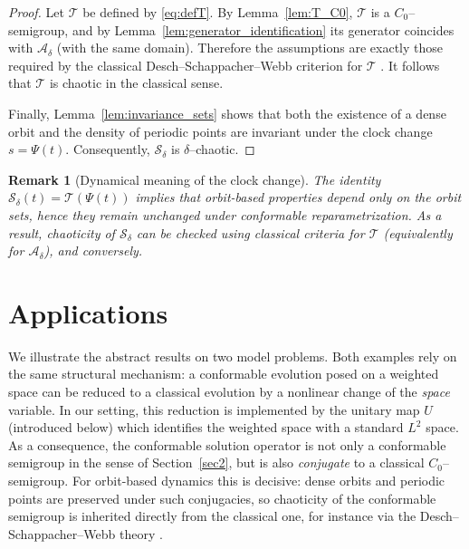 \documentclass[preprint,12pt]{elsarticle}
\newtheorem{remark}{Remark}
\newtheorem{proof}{Proof}
\begin{document}
\begin{proof}
Let $\mathcal T$ be defined by \eqref{eq:defT}.
By Lemma~\ref{lem:T_C0}, $\mathcal T$ is a $C_0$--semigroup, and by
Lemma~\ref{lem:generator_identification} its generator coincides with $\mathcal A_\delta$
(with the same domain).
Therefore the assumptions are exactly those required by the classical
Desch--Schappacher--Webb criterion for $\mathcal T$ \cite{desch1997}.
It follows that $\mathcal T$ is chaotic in the classical sense.

Finally, Lemma~\ref{lem:invariance_sets} shows that both the existence of a dense orbit
and the density of periodic points are invariant under the clock change
$s=\Psi(t)$.
Consequently, $\mathcal S_\delta$ is $\delta$--chaotic.
\end{proof}

\begin{remark}[Dynamical meaning of the clock change]\label{rem:clock_dynamics}
The identity $\mathcal S_\delta(t)=\mathcal T(\Psi(t))$ implies that orbit-based
properties depend only on the orbit sets, hence they remain unchanged under conformable
reparametrization.
As a result, chaoticity of $\mathcal S_\delta$ can be checked using classical criteria
for $\mathcal T$ (equivalently for $\mathcal A_\delta$), and conversely.
\end{remark}

\section{Applications}\label{sec7}

We illustrate the abstract results on two model problems.
Both examples rely on the same structural mechanism: a conformable evolution posed
on a weighted space can be reduced to a classical evolution by a nonlinear change
of the \emph{space} variable.
In our setting, this reduction is implemented by the unitary map $U$ (introduced
below) which identifies the weighted space with a standard $L^2$ space.
As a consequence, the conformable solution operator is not only a conformable
semigroup in the sense of Section~\ref{sec2}, but is also \emph{conjugate} to a
classical $C_0$--semigroup.
For orbit-based dynamics this is decisive: dense orbits and periodic points are
preserved under such conjugacies, so chaoticity of the conformable semigroup is
inherited directly from the classical one, for instance via the
Desch--Schappacher--Webb theory \cite{desch1997}.
\end{document}
